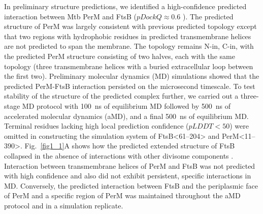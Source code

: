 \documentclass[twocolumn,pdflatex,sn-nature]{sn-jnl}%
\def\textsuperscript#1{<#1>}%
\newcommand\mtb{Mtb}
\begin{document}
In preliminary structure predictions, we identified a high-confidence predicted interaction between \mtb{} PerM and FtsB ($pDockQ \approx 0.6$ \citep{bryantImprovedPredictionProteinprotein2022}).
The predicted structure of PerM was largely consistent with previous predicted topology \citep{goodsmithDisruptionTuberculosisMembrane2015} except that two regions with hydrophobic residues in predicted transmembrane helices are not predicted to span the membrane.
The topology remains N-in, C-in, with the predicted PerM structure consisting of two halves, each with the same topology (three transmembrane helices with a buried extracellular loop between the first two).
Preliminary molecular dynamics (MD) simulations showed that the predicted PerM-FtsB interaction persisted on the microsecond timescale.
To test stability of the structure of the predicted complex further, we carried out a three-stage MD protocol with \qty{100}{\ns} of equilibrium MD followed by \qty{500}{\ns} of accelerated molecular dynamics (aMD), and a final \qty{500}{\ns} of equilibrium MD.
Terminal residues lacking high local prediction confidence ($pLDDT < 50$) were omitted in constructing the simulation system of FtsB\textsuperscript{61--204} and PerM\textsuperscript{11--390}.
Fig.~\ref{fig1_1}A shows how the predicted extended structure of FtsB collapsed in the absence of interactions with other divisome components \citep{brittonConformationalChangesEssential2023,cravenModelInteractionsFtsQLB2022,attaibiUpdatedModelDivisome2022,kashammerCryoEMStructureBacterial2023}.
Interaction between transmembrane helices of PerM and FtsB was not predicted with high confidence and also did not exhibit persistent, specific interactions in MD.
Conversely, the predicted interaction between FtsB and the periplasmic face of PerM and a specific region of PerM was maintained throughout the aMD protocol and in a simulation replicate.
\end{document}
